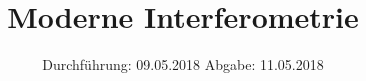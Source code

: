 

\subject{V64}
\title{\texorpdfstring{ Moderne Interferometrie}{}}
\date{
	Durchführung: 09.05.2018
	\hspace{4em}
	Abgabe: 11.05.2018
}


	\maketitle
	\newpage
	\tableofcontents
	\newpage
	
	
	
	
	
	
	\newpage

	\printbibliography

